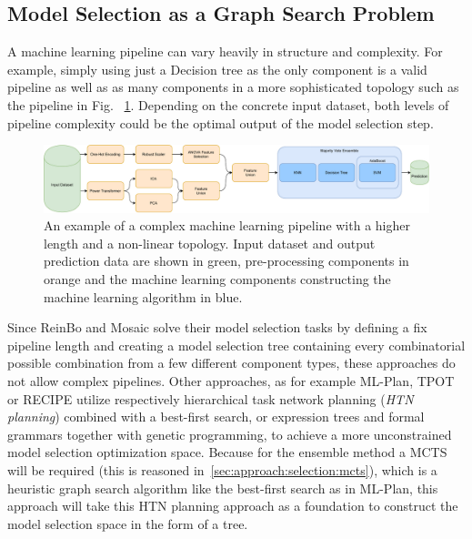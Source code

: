 \subsection{Model Selection as a Graph Search Problem}
\label{sec:approach:selection:search}
A machine learning pipeline can vary heavily in structure and complexity.
For example, simply using just a Decision tree as the only component is a valid pipeline as well as as many components in a more sophisticated topology such as the pipeline in Fig. ~\ref{fig:approach:complex-pipeline}.
Depending on the concrete input dataset, both levels of pipeline complexity could be the optimal output of the model selection step.
\begin{figure}[ht!]
    \centering
    \includegraphics[width=\textwidth]{gfx/Figures/Approach/ComplexPipeline.pdf}
    \caption[An example of a complex machine learning pipeline with a higher length and a non-linear topology.]{An example of a complex machine learning pipeline with a higher length and a non-linear topology. Input dataset and output prediction data are shown in green, pre-processing components in orange and the machine learning components constructing the machine learning algorithm in blue.}
    \label{fig:approach:complex-pipeline}
\end{figure}

Since ReinBo and Mosaic solve their model selection tasks by defining a fix pipeline length and creating a model selection tree containing every combinatorial possible combination from a few different component types, these approaches do not allow complex pipelines.\newline
Other approaches, as for example ML-Plan, TPOT or RECIPE utilize respectively hierarchical task network planning (\textit{HTN planning}) combined with a best-first search, or expression trees and formal grammars together with genetic programming, to achieve a more unconstrained model selection optimization space.
Because for the ensemble method a MCTS will be required (this is reasoned in~\ref{sec:approach:selection:mcts}), which is a heuristic graph search algorithm like the best-first search as in ML-Plan, this approach will take this HTN planning approach as a foundation to construct the model selection space in the form of a tree.

